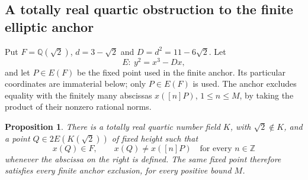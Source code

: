 \documentclass[11pt]{article}
\newtheorem{proposition}[theorem]{Proposition}
\theoremstyle{definition}
\begin{document}
\subsection{A totally real quartic obstruction to the finite elliptic anchor}

Put $F=\mathbb Q(\sqrt2)$, $d=3-\sqrt2$ and
$D=d^2=11-6\sqrt2$.  Let
\[
                         E:\ y^2=x^3-Dx,
\]
and let $P\in E(F)$ be the fixed point used in the finite
anchor.  Its particular coordinates are immaterial below;
only $P\in E(F)$ is used.  The anchor excludes equality with
the finitely many abscissas $x([n]P)$, $1\le n\le M$, by
taking the product of their nonzero rational norms.

\begin{proposition}\label{prop:totally-real-anchor-counterexample-phase3}
There is a totally real quartic number field $K$, with
$\sqrt2\notin K$, and a point $Q\in2E(K(\sqrt2))$ of
fixed height such that
\[
              x(Q)\in F,\qquad x(Q)\ne x([n]P)
                       \quad\text{for every }n\in\mathbb Z
\]
whenever the abscissa on the right is defined.  The same fixed
point therefore satisfies every finite anchor exclusion, for
every positive bound $M$.
\end{proposition}
\end{document}
